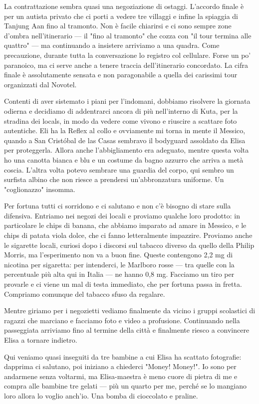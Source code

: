 La contrattazione sembra quasi una negoziazione di ostaggi. L'accordo finale è per un autista privato che ci porti a vedere tre villaggi e infine la spiaggia di Tanjung Aan fino al tramonto. Non è facile chiarirsi e ci sono sempre zone d'ombra nell'itinerario — il "fino al tramonto" che cozza con "il tour termina alle quattro" — ma continuando a insistere arriviamo a una quadra. Come precauzione, durante tutta la conversazione lo registro col cellulare. Forse un po' paranoico, ma ci serve anche a tenere traccia dell'itinerario concordato. La cifra finale è assolutamente sensata e non paragonabile a quella dei carissimi tour organizzati dal Novotel.

Contenti di aver sistemato i piani per l'indomani, dobbiamo risolvere la giornata odierna e decidiamo di addentrarci ancora di più nell'interno di Kuta, per la stradina dei locals, in modo da vedere come vivono e riuscire a scattare foto autentiche. Eli ha la Reflex al collo e ovviamente mi torna in mente il Messico, quando a San Cristóbal de las Casas sembravo il bodyguard assoldato da Elisa per proteggerla. Allora anche l'abbigliamento era adeguato, mentre questa volta ho una canotta bianca e blu e un costume da bagno azzurro che arriva a metà coscia. L'altra volta potevo sembrare una guardia del corpo, qui sembro un surfista albino che non riesce a prendersi un'abbronzatura uniforme. Un "coglionazzo" insomma.

Per fortuna tutti ci sorridono e ci salutano e non c'è bisogno di stare sulla difensiva. Entriamo nei negozi dei locali e proviamo qualche loro prodotto: in particolare le chips di banana, che abbiamo imparato ad amare in Messico, e le chips di patata viola dolce, che ci fanno letteralmente impazzire. Proviamo anche le sigarette locali, curiosi dopo i discorsi sul tabacco diverso da quello della Philip Morris, ma l'esperimento non va a buon fine. Queste contengono 2,2 mg di nicotina per sigaretta: per intenderci, le Marlboro rosse — tra quelle con la percentuale più alta qui in Italia — ne hanno 0,8 mg. Facciamo un tiro per provarle e ci viene un mal di testa immediato, che per fortuna passa in fretta. Compriamo comunque del tabacco sfuso da regalare.

Mentre giriamo per i negozietti vediamo finalmente da vicino i gruppi scolastici di ragazzi che marciano e facciamo foto e video a profusione. Continuando nella passeggiata arriviamo fino al termine della città e finalmente riesco a convincere Elisa a tornare indietro.

Qui veniamo quasi inseguiti da tre bambine a cui Elisa ha scattato fotografie: dapprima ci salutano, poi iniziano a chiederci "Money! Money!". Io sono per andarmene senza voltarmi, ma Elisa-maestra è meno cuore di pietra di me e compra alle bambine tre gelati — più un quarto per me, perché se lo mangiano loro allora lo voglio anch'io. Una bomba di cioccolato e praline.

